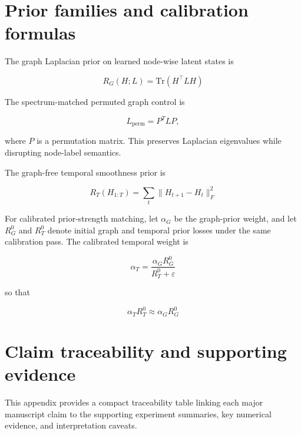 \documentclass[preprint,12pt]{elsarticle}
\begin{document}
\section{Prior families and calibration formulas}

The graph Laplacian prior on learned node-wise latent states is

\begin{equation}
R_G(H;L)=\mathrm{Tr}(H^\top L H)
\end{equation}

The spectrum-matched permuted graph control is

\begin{equation}
L_{\mathrm{perm}} = P^T L P,
\end{equation}

where $P$ is a permutation matrix. This preserves Laplacian eigenvalues while disrupting node-label semantics.

The graph-free temporal smoothness prior is

\begin{equation}
R_T(H_{1:T})=\sum_t \lVert H_{t+1}-H_t \rVert_F^2
\end{equation}

For calibrated prior-strength matching, let $\alpha_G$ be the graph-prior weight, and let $R_G^0$ and $R_T^0$ denote initial graph and temporal prior losses under the same calibration pass. The calibrated temporal weight is

\begin{equation}
\alpha_T = \frac{\alpha_G R_G^0}{R_T^0+\varepsilon}
\end{equation}

so that

\begin{equation}
\alpha_T R_T^0 \approx \alpha_G R_G^0
\end{equation}

\section{Claim traceability and supporting evidence}
\label{app:traceability}

This appendix provides a compact traceability table linking each major manuscript claim to the supporting experiment summaries, key numerical evidence, and interpretation caveats.
\end{document}
